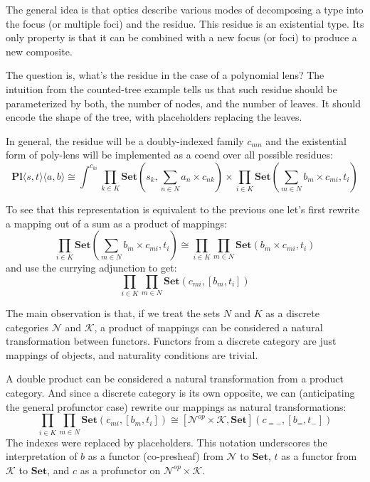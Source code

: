 \documentclass[11pt]{amsart}
\begin{document}
The general idea is that optics describe various modes of decomposing a type into the focus (or multiple foci) and the residue. This residue is an existential type. Its only property is that it can be combined with a new focus (or foci) to produce a new composite.

The question is, what's the residue in the case of a polynomial lens? The intuition from the counted-tree example tells us that such residue should be parameterized by both, the number of nodes, and the number of leaves. It should encode the shape of the tree, with placeholders replacing the leaves. 

In general, the residue will be a doubly-indexed family $c_{m n}$ and the existential form of poly-lens will be implemented as a coend over all possible residues:
\[ \mathbf{Pl}\langle s, t\rangle \langle a, b\rangle \cong \int^{c_{k i}} 
 \prod_{k \in K} \mathbf{Set} \left(s_k,  \sum_{n \in N} a_n \times c_{n k} \right) \times 
 \prod_{i \in K}  \mathbf{Set} \left(\sum_{m \in N} b_m \times c_{m i}, t_i \right) \]

To see that this representation is equivalent to the previous one let's first rewrite a mapping out of a sum as a product of mappings:
\[ \prod_{i \in K}  \mathbf{Set} \left(\sum_{m \in N} b_m \times c_{m i}, t_i \right) \cong 
\prod_{i \in K} \prod_{m \in N} \mathbf{Set}\left(b_m \times c_{m i}, t_i \right)\]
and use the currying adjunction to get:
\[ \prod_{i \in K} \prod_{m \in N} \mathbf{Set}\left(c_{m i}, [b_m, t_i ]\right)\]

The main observation is that, if we treat the sets $N$ and $K$ as a discrete categories $\mathcal{N}$ and $\mathcal{K}$, a product of mappings can be considered a natural transformation between functors. Functors from a discrete category are just mappings of objects, and naturality conditions are trivial. 


A double product can be considered a natural transformation from a product category. And since a discrete category is its own opposite, we can (anticipating the general profunctor case) rewrite our mappings as natural transformations:
\[ \prod_{i \in K} \prod_{m \in N} \mathbf{Set} \left(c_{m i}, [b_m, t_i] \right) \cong 
[\mathcal{N}^{op} \times \mathcal{K}, \mathbf{Set}]\left(c_{= -}, [b_=, t_- ]\right)\]
The indexes were replaced by placeholders. This notation underscores the interpretation of $b$ as a functor (co-presheaf) from $\mathcal{N}$ to $\mathbf{Set}$,  $t$ as a functor from $\mathcal{K}$ to $\mathbf{Set}$, and $c$ as a profunctor on $\mathcal{N}^{op} \times \mathcal{K}$.
\end{document}
